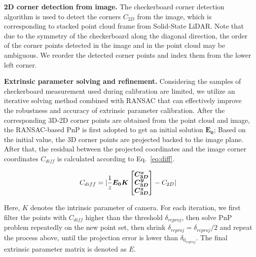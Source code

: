 \documentclass[journal]{vgtc}
\begin{document}
\textbf{2D corner detection from image.} The checkerboard corner detection algorithm \cite{duda2018accurate} is used to detect the corners $C_{2D}$ from the image, which is corresponding to stacked point cloud frame from Solid-State LiDAR. Note that due to the symmetry of the checkerboard along the diagonal direction, the order of the corner points detected in the image and in the point cloud may be ambiguous. We reorder the detected corner points and index them from the lower left corner.

\textbf{Extrinsic parameter solving and refinement.}
Considering the samples of checkerboard measurement used during calibration are limited, we utilize an iterative solving method combined with RANSAC that can effectively improve the robustness and accuracy of extrinsic parameter calibration. After the corresponding 3D-2D corner points are obtained from the point cloud and image, the RANSAC-based PnP is first adopted to get an initial solution $\bm {E_0}$; Based on the initial value, the 3D corner points are projected backed to the image plane. After that, the residual between the projected coordinates and the image corner coordinates $C_{diff}$ is calculated according to Eq.~\ref{eq:diff}.

\begin{equation}
	\label{eq:diff}
	\centering
	C_{diff}=|\frac{1}{z} \bm{E_0} \bm{K}
	\left [
		\begin{matrix}
			\bm {C^x_{3D}} \\
			\bm {C^y_{3D}} \\
			\bm {C^z_{3D}} 
		\end{matrix}
	\right]
	-C_{2D}|
\end{equation}

Here, $K$ denotes the intrinsic parameter of camera. For each iteration, we first filter the points with $C_{diff}$ higher than the threshold $\delta_{reproj}$, then solve PnP problem repeatedly on the new point set, then shrink $\delta_{reproj}=\delta_{reproj}/2$ and repeat the process above, until the projection error is lower than $\delta_{0_{reproj}}$. The final extrinsic parameter matrix is denoted as $E$. 
\end{document}
